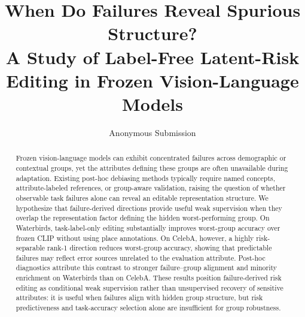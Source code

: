 \documentclass[letterpaper]{article} %
\title{When Do Failures Reveal Spurious Structure?\\A Study of Label-Free Latent-Risk Editing in Frozen Vision-Language Models}
\author{Anonymous Submission}
\begin{document}
\maketitle

\begin{abstract}
Frozen vision-language models can exhibit concentrated failures across demographic or contextual groups, yet the attributes defining these groups are often unavailable during adaptation. Existing post-hoc debiasing methods typically require named concepts, attribute-labeled references, or group-aware validation, raising the question of whether observable task failures alone can reveal an editable representation structure. We hypothesize that failure-derived directions provide useful weak supervision when they overlap the representation factor defining the hidden worst-performing group. On Waterbirds, task-label-only editing substantially improves worst-group accuracy over frozen CLIP without using place annotations. On CelebA, however, a highly risk-separable rank-1 direction reduces worst-group accuracy, showing that predictable failures may reflect error sources unrelated to the evaluation attribute. Post-hoc diagnostics attribute this contrast to stronger failure–group alignment and minority enrichment on Waterbirds than on CelebA. These results position failure-derived risk editing as conditional weak supervision rather than unsupervised recovery of sensitive attributes: it is useful when failures align with hidden group structure, but risk predictiveness and task-accuracy selection alone are insufficient for group robustness.
\end{abstract}











\end{document}
